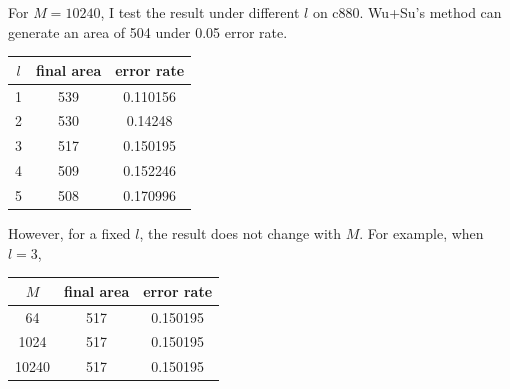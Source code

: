 \documentclass{rpt}
\begin{document}
For $M=10240$, I test the result under different $l$ on c880.
Wu+Su's method can generate an area of 504 under 0.05 error rate.

\begin{tabular}{ccc}
    \hline
    $l$ & final area & error rate \\
    \hline
    1 & 539 & 0.110156 \\
    \hline
    2 & 530 & 0.14248 \\
    \hline
    3 & 517 & 0.150195 \\
    \hline
    4 & 509 & 0.152246\\
    \hline
    5 & 508 & 0.170996\\
    \hline
\end{tabular}

However,
for a fixed $l$,
the result does not change with $M$.
For example,
when $l=3$,

\begin{tabular}{ccc}
    \hline
    $M$ & final area & error rate \\
    \hline
    64 & 517 & 0.150195 \\
    \hline
    1024 & 517 & 0.150195 \\
    \hline
    10240 & 517 & 0.150195 \\
    \hline
\end{tabular}
\end{document}
